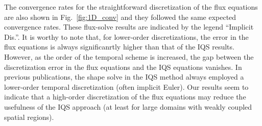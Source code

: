 \documentclass{elsarticle}
\newcommand{\fig}[1]{Fig.~\ref{#1}}                      %
\begin{document}
The convergence rates for the straightforward discretization of the flux equations are also shown in \fig{fig:1D_conv} and they followed the same expected convergence rates.
These flux-solve results are indicated by the legend ``Implicit Dis.''. It is worthy to note that, for lower-order discretizations, the error in the flux equations is always significanrtly higher 
than that of the IQS results. However, as the order of the temporal scheme is increased, the gap between the discretization error in the flux equations and the IQS equations vanishes. 
In previous publications, the shape solve in the IQS method always employed a lower-order temporal discretization
(often implicit Euler). Our results seem to indicate that a high-order discretization 
of the flux equations may reduce the usefulness of the IQS approach (at least for large domains with weakly coupled spatial regions).
\end{document}
